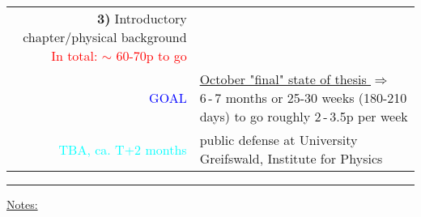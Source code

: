 \documentclass[%
    a4,
    10pt,
    twoside
    ]{%
    scrreprt%
    }
\newcommand{\foo}{%
  \hspace{-2.3pt}$\bullet$ \hspace{5pt}%
}
\begin{document}
\begin{table}[h!]
\begin{tabular}{r |@{\foo} p{}}
      \textbf{3)} Introductory chapter/physical background\newline%
      \textcolor{red}{%
        In total: $\sim$ 60-70p to go}%
      \newline\\%
      \textcolor{blue}{GOAL} & %
      \underline{%
        October "final" state of thesis%
      }\newline%
      $\Rightarrow$ 6\,-\,7 months or 25-30 weeks (180-210 days) to go\newline%
      roughly 2\,-\,3.5p per week%
      \newline\\%
      \textcolor{cyan}{TBA, ca. T+2 months}\newline & %
      public defense at University Greifswald, Institute for Physics%
      \newline\\%

    \end{tabular}%

  \end{table}
      
  \par\noindent\rule{\textwidth}{0.4pt}

  \flushleft%
  \large\underline{Notes:}%
\end{document}
